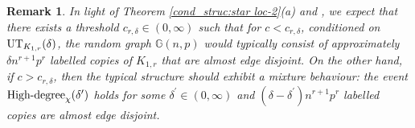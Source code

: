 \documentclass[a4paper,11pt,english,reqno]{amsart}
\numberwithin{equation}{section}
\newcommand{\G}{\mathbb{G}}
\newcommand{\tu}[1]{\textup{#1}}
\newtheorem{remark}[theorem]{Remark}
\newcommand{\red}[1]{{\color{red} #1}}
\begin{document}
	\begin{remark}
		In light of Theorem \ref{cond_struc:star loc-2}(a) and \cite[Theorems 1.1 and Proposition 4.4]{AS25}, we expect that %
there exists a threshold $c_{r,\delta}\in (0,\infty)$ such that %
for $c<c_{r,\delta}$, conditioned on $\tu{UT}_{K_{1,r}}(\delta)$,  the random graph $\G(n,p)$ would typically consist of approximately $\delta n^{r+1}p^{r}$ labelled copies of $K_{1,r}$ that are almost edge disjoint. %
On the other hand, if $c>c_{r,\delta}$, then the typical structure should exhibit a mixture behaviour: the event $\tu{High-degree}_\chi(\delta^{\prime})$ holds for some $\delta^{\prime}\in (0,\infty)$ and  $(\delta-\delta^{\prime})n^{r+1}p^{r}$ labelled copies are almost edge disjoint. %

	\end{remark}
	
	
	
\end{document}
